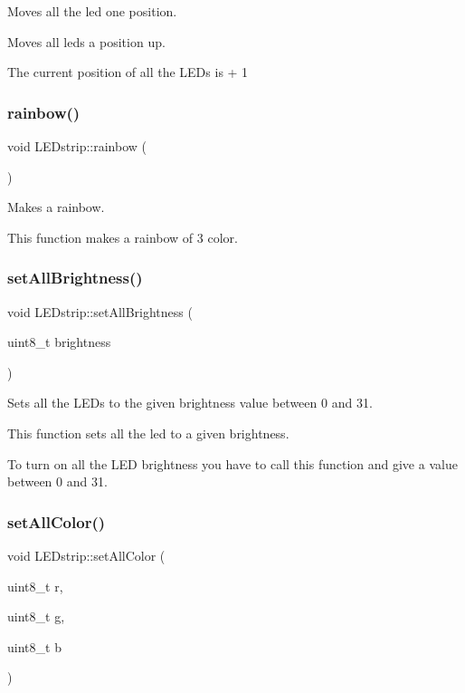 Moves all the led one position. 

Moves all leds a position up.

The current position of all the L\+E\+Ds is + 1 \mbox{\label{class_l_e_dstrip_af55f0cd37fa12d3c06c1c3b6097760f8}} 
\subsubsection{\texorpdfstring{rainbow()}{rainbow()}}
{\footnotesize\ttfamily void L\+E\+Dstrip\+::rainbow (\begin{DoxyParamCaption}{ }\end{DoxyParamCaption})}



Makes a rainbow. 

This function makes a rainbow of 3 color. \mbox{\label{class_l_e_dstrip_aa8703c4d75730b7ca47f3a97c722973a}} 
\subsubsection{\texorpdfstring{set\+All\+Brightness()}{setAllBrightness()}}
{\footnotesize\ttfamily void L\+E\+Dstrip\+::set\+All\+Brightness (\begin{DoxyParamCaption}\item[{uint8\+\_\+t}]{brightness }\end{DoxyParamCaption})}



Sets all the L\+E\+Ds to the given brightness value between 0 and 31. 

This function sets all the led to a given brightness.

To turn on all the L\+ED brightness you have to call this function and give a value between 0 and 31. \mbox{\label{class_l_e_dstrip_a42a90dcca3baf0e2a6e208129761f1b9}} 
\subsubsection{\texorpdfstring{set\+All\+Color()}{setAllColor()}}
{\footnotesize\ttfamily void L\+E\+Dstrip\+::set\+All\+Color (\begin{DoxyParamCaption}\item[{uint8\+\_\+t}]{r,  }\item[{uint8\+\_\+t}]{g,  }\item[{uint8\+\_\+t}]{b }\end{DoxyParamCaption})}



